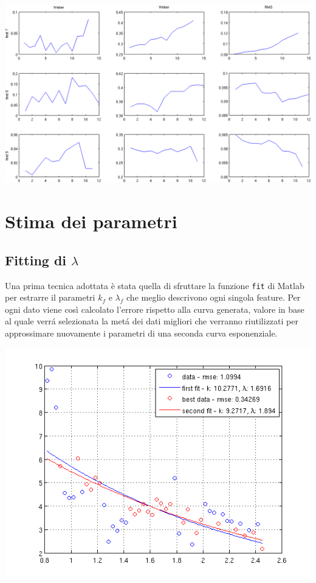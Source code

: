 \documentclass[12pt]{report}
\begin{document}
\begin{center}
	\includegraphics[scale=0.7, angle=90.0]{images/compContr3.png}
	\label{fig:contr03}
\end{center}




\section{Stima dei parametri}

\subsection{Fitting di $\lambda$}

\noindent Una prima tecnica adottata \`e stata quella di sfruttare la funzione \verb|fit| di Matlab per estrarre il parametri $k_f$ e $\lambda_f$ che meglio descrivono ogni singola feature. Per ogni dato viene cos\`i calcolato l'errore rispetto alla curva generata, valore in base al quale verr\'a selezionata la met\'a dei dati migliori che verranno riutilizzati per approssimare nuovamente i parametri di una seconda curva esponenziale.\\

\begin{center}
	\includegraphics[scale=0.75]{images/twoFits.png}
	\label{fig:twoFits}
\end{center}
\end{document}
